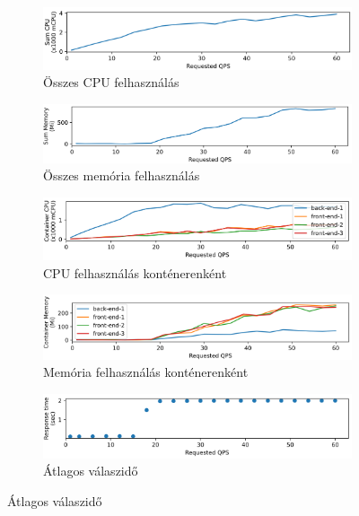 \begin{figure}
\centering
\begin{subfigure}{\textwidth}
    \includegraphics[width=\textwidth]{figures/3FE-1BE-chain/sum-cpu.png}
    \caption{Összes CPU felhasználás}
    \label{subfig:sum-cpu}
\end{subfigure}

\hfill
\begin{subfigure}{\textwidth}
    \includegraphics[width=\textwidth]{figures/3FE-1BE-chain/sum-mem.png}
    \caption{Összes memória felhasználás}
    \label{subfig:sum-mem}
\end{subfigure}

\hfill
\begin{subfigure}{\textwidth}
    \includegraphics[width=\textwidth]{figures/3FE-1BE-chain/container-cpu.png}
    \caption{CPU felhasználás konténerenként}
    \label{subfig:container-cpu}
\end{subfigure}

\hfill
\begin{subfigure}{\textwidth}
    \includegraphics[width=\textwidth]{figures/3FE-1BE-chain/container-mem.png}
    \caption{Memória felhasználás konténerenként}
    \label{subfig:container-mem}
\end{subfigure}

\hfill
\begin{subfigure}{\textwidth}
    \includegraphics[width=\textwidth]{figures/3FE-1BE-chain/resp-time.png}
    \caption{Átlagos válaszidő}
    \label{subfig:resp-time}
\end{subfigure}


\end{figure}
